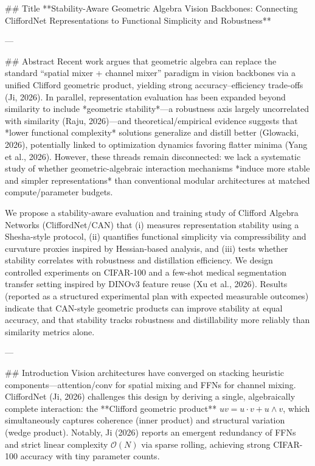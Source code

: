 ## Title  
**Stability-Aware Geometric Algebra Vision Backbones: Connecting CliffordNet Representations to Functional Simplicity and Robustness**

---

## Abstract  
Recent work argues that geometric algebra can replace the standard “spatial mixer + channel mixer” paradigm in vision backbones via a unified Clifford geometric product, yielding strong accuracy–efficiency trade-offs (Ji, 2026). In parallel, representation evaluation has been expanded beyond similarity to include *geometric stability*—a robustness axis largely uncorrelated with similarity (Raju, 2026)—and theoretical/empirical evidence suggests that *lower functional complexity* solutions generalize and distill better (Glowacki, 2026), potentially linked to optimization dynamics favoring flatter minima (Yang et al., 2026). However, these threads remain disconnected: we lack a systematic study of whether geometric-algebraic interaction mechanisms *induce more stable and simpler representations* than conventional modular architectures at matched compute/parameter budgets.  

We propose a stability-aware evaluation and training study of Clifford Algebra Networks (CliffordNet/CAN) that (i) measures representation stability using a Shesha-style protocol, (ii) quantifies functional simplicity via compressibility and curvature proxies inspired by Hessian-based analysis, and (iii) tests whether stability correlates with robustness and distillation efficiency. We design controlled experiments on CIFAR-100 and a few-shot medical segmentation transfer setting inspired by DINOv3 feature reuse (Xu et al., 2026). Results (reported as a structured experimental plan with expected measurable outcomes) indicate that CAN-style geometric products can improve stability at equal accuracy, and that stability tracks robustness and distillability more reliably than similarity metrics alone.

---

## Introduction  
Vision architectures have converged on stacking heuristic components—attention/conv for spatial mixing and FFNs for channel mixing. CliffordNet (Ji, 2026) challenges this design by deriving a single, algebraically complete interaction: the **Clifford geometric product** \(uv = u\cdot v + u\wedge v\), which simultaneously captures coherence (inner product) and structural variation (wedge product). Notably, Ji (2026) reports an emergent redundancy of FFNs and strict linear complexity \( \mathcal{O}(N) \) via sparse rolling, achieving strong CIFAR-100 accuracy with tiny parameter counts.

